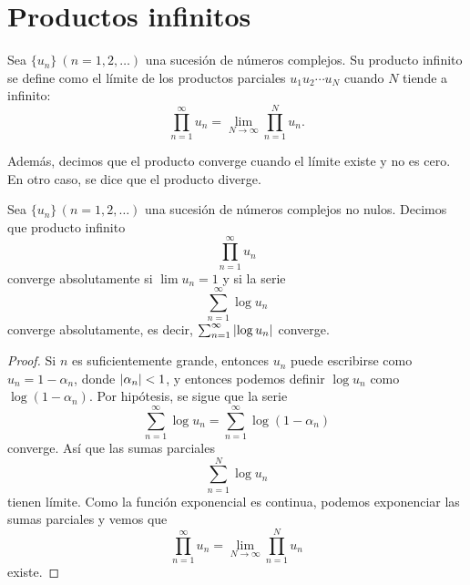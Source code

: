 \chapter{Productos infinitos}

\begin{definition}
    Sea $\{u_n\} \ (n=1,2, \dots)$ una sucesión de números complejos. Su producto infinito se define como el límite de los productos parciales $u_1 u_2 \cdots u_N$ cuando $N$ tiende a infinito:
\begin{equation*}
    \prod_{n=1}^{\infty} u_n = \lim_{N \rightarrow \infty} \prod_{n=1}^{N} u_n.
\end{equation*}


Además, decimos que el producto converge cuando el límite existe y no es cero. En otro caso, se dice que el producto diverge.
\end{definition}

\bigskip

\begin{prop}
    Sea $\{u_n\} \, (n=1,2, \dots)$ una sucesión de números complejos no nulos.
    Decimos que producto infinito
    \begin{equation*}
        \prod_{n=1}^{\infty} u_n
    \end{equation*}
    converge absolutamente si $\lim u_n =1$ y si la serie
    \begin{equation*}
        \sum_{n=1}^{\infty} \log u_n
    \end{equation*}
    converge absolutamente, es decir, $ \sum_{n=1}^{\infty} \left\lvert\log u_n\right\rvert$ converge.
\end{prop}

\begin{proof}
    Si $n$ es suficientemente grande, entonces $u_n$ puede escribirse como $u_n = 1 - \alpha_n$, donde $\left\lvert\alpha_n\right\rvert < 1$, y entonces podemos definir $\log{u_n}$ como $\log{(1 - \alpha_n)}$. Por hipótesis, se sigue que la serie
    \begin{equation*}
        \sum_{n=1}^{\infty} \log u_n = \sum_{n=1}^{\infty} \log{(1 - \alpha_n)}
    \end{equation*}
    converge. Así que las sumas parciales
    \begin{equation*}
        \sum_{n=1}^{N} \log u_n
    \end{equation*}
    tienen límite. Como la función exponencial es continua, podemos exponenciar las sumas parciales y vemos que
    \begin{equation*}
        \prod_{n=1}^{\infty} u_n = \lim_{N \rightarrow \infty} \prod_{n=1}^{N} u_n
    \end{equation*}
    existe.
\end{proof}

